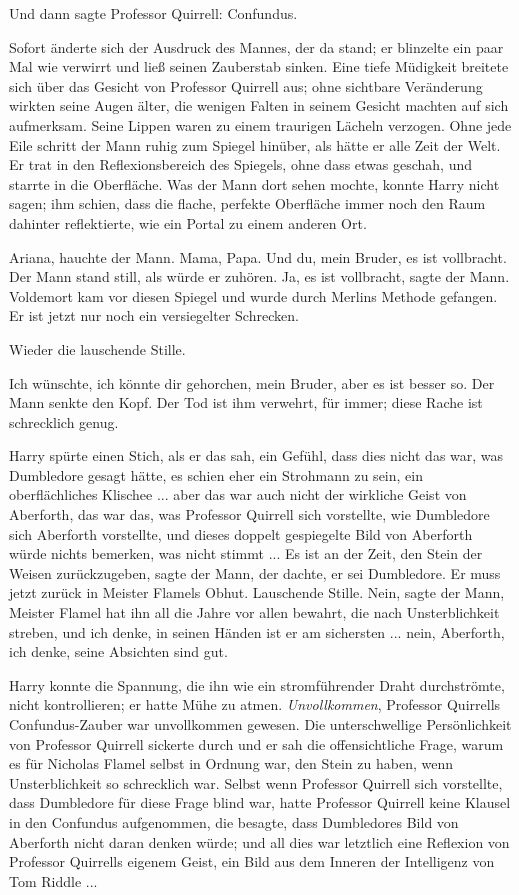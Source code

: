 Und dann sagte Professor Quirrell: \glqq{}Confundus.\grqq{}

Sofort änderte sich der Ausdruck des Mannes, der da stand; er blinzelte ein paar
Mal wie verwirrt und ließ seinen Zauberstab sinken. Eine tiefe Müdigkeit
breitete sich über das Gesicht von Professor Quirrell aus; ohne sichtbare
Veränderung wirkten seine Augen älter, die wenigen Falten in seinem Gesicht
machten auf sich aufmerksam. Seine Lippen waren zu einem traurigen Lächeln
verzogen. Ohne jede Eile schritt der Mann ruhig zum Spiegel hinüber, als hätte
er alle Zeit der Welt. Er trat in den Reflexionsbereich des Spiegels, ohne dass
etwas geschah, und starrte in die Oberfläche. Was der Mann dort sehen mochte,
konnte Harry nicht sagen; ihm schien, dass die flache, perfekte Oberfläche immer
noch den Raum dahinter reflektierte, wie ein Portal zu einem anderen Ort.

\glqq{}Ariana\grqq{}, hauchte der Mann. \glqq{}Mama, Papa. Und du, mein Bruder,
es ist vollbracht.\grqq{} Der Mann stand still, als würde er zuhören. \glqq{}Ja,
es ist vollbracht\grqq{}, sagte der Mann. \glqq{}Voldemort kam vor diesen Spiegel
und wurde durch Merlins Methode gefangen. Er ist jetzt nur noch ein versiegelter
Schrecken.\grqq{}

Wieder die lauschende Stille.

\glqq{}Ich wünschte, ich könnte dir gehorchen, mein Bruder, aber es ist besser
so.\grqq{} Der Mann senkte den Kopf. \glqq{}Der Tod ist ihm verwehrt, für immer;
diese Rache ist schrecklich genug.\grqq{}

Harry spürte einen Stich, als er das sah, ein Gefühl, dass dies nicht das war,
was Dumbledore gesagt hätte, es schien eher ein Strohmann zu sein, ein
oberflächliches Klischee ... aber das war auch nicht der wirkliche Geist von
Aberforth, das war das, was Professor Quirrell sich vorstellte, wie Dumbledore
sich Aberforth vorstellte, und dieses doppelt gespiegelte Bild von Aberforth
würde nichts bemerken, was nicht stimmt ... \glqq{}Es ist an der Zeit, den Stein
der Weisen zurückzugeben\grqq{}, sagte der Mann, der dachte, er sei Dumbledore.
\glqq{}Er muss jetzt zurück in Meister Flamels Obhut.\grqq{} Lauschende Stille.
\glqq{}Nein\grqq{}, sagte der Mann, \glqq{}Meister Flamel hat ihn all die Jahre
vor allen bewahrt, die nach Unsterblichkeit streben, und ich denke, in seinen
Händen ist er am sichersten ... nein, Aberforth, ich denke, seine Absichten sind
gut.\grqq{}

Harry konnte die Spannung, die ihn wie ein stromführender Draht durchströmte,
nicht kontrollieren; er hatte Mühe zu atmen. \emph{Unvollkommen}, Professor
Quirrells Confundus-Zauber war unvollkommen gewesen. Die unterschwellige
Persönlichkeit von Professor Quirrell sickerte durch und er sah die
offensichtliche Frage, warum es für Nicholas Flamel selbst in Ordnung war, den
Stein zu haben, wenn Unsterblichkeit so schrecklich war. Selbst wenn Professor
Quirrell sich vorstellte, dass Dumbledore für diese Frage blind war, hatte
Professor Quirrell keine Klausel in den Confundus aufgenommen, die besagte, dass
Dumbledores Bild von Aberforth nicht daran denken würde; und all dies war
letztlich eine Reflexion von Professor Quirrells eigenem Geist, ein Bild aus dem
Inneren der Intelligenz von Tom Riddle ...

